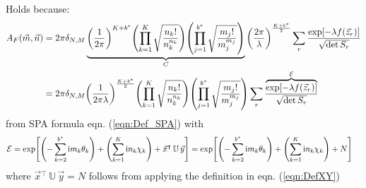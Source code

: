 \documentclass[
	english,
	a4paper,
	fontsize=10pt,
	parskip=half,
	titlepage=true,
	DIV=12,
	final
]{scrreprt}
\newcommand*{\transp}{\ensuremath{^\intercal}}
\newcommand*{\iunit}{\ensuremath{\mathrm{i}}}
\begin{document}
Holds because:
\begin{align}
	A_F(\vec{m}, \vec{n})
&=
	2\pi \delta_{N,M}
	\underbrace{
		\qty(
			\frac{1}{2\pi}
		)^{K + b^*}
		\qty( \prod_{k=1}^{K}
			\sqrt{\frac
				{ n_k! }
				{ n_k^{n_k} }
			}
		)
		\qty( \prod_{j=1}^{b^*}
			\sqrt{\frac
				{ m_j! }
				{ m_j^{m_j} }
			}
		)
	}_{C}
	\qty(
		\frac{2\pi}{\lambda}
	)^{\frac{K + b^*}{2}}
	\sum_r
		\frac
			{\exp[-\lambda f(\vec{z}_r)]}
			{\sqrt{\det S_r}} \\
&=
	2\pi \delta_{N,M} \qty(
		\frac{1}{2\pi\lambda}
	)^{\frac{K + b^*}{2}}
	\qty( \prod_{k=1}^{K}
		\sqrt{\frac
			{ n_k! }
			{ n_k^{n_k} }
		}
	)
	\qty( \prod_{j=1}^{b^*}
		\sqrt{\frac
			{ m_j! }
			{ m_j^{m_j} }
		}
	)
	\sum_r
		\frac
		{\overbrace{
			\exp[-\lambda f(\vec{z}_r)]
		}^{\mathcal{E}}}
		{\sqrt{\det S_r}}
\end{align}
from SPA formula eqn. (\ref{eqn:Def_SPA}) with
\begin{align}
	\mathcal{E}
&=
	\exp[ 
		\qty(- \sum_{k=2}^{b^*} \iunit m_k \theta_k) + 
		\qty(  \sum_{k=1}^{K}   \iunit n_k \chi  _k)   +
		\vec{x}\transp \, \mathbb{U} \, \vec{y}
	]
=
	\exp[ 
		\qty(- \sum_{k=2}^{b^*} \iunit m_k \theta_k) + 
		\qty(  \sum_{k=1}^{K}   \iunit n_k \chi  _k)   +
		N
	]
\end{align}
where $\vec{x}\transp \, \mathbb{U} \, \vec{y} = N$ follows from applying the definition in eqn. (\ref{eqn:DefXY})
\end{document}
